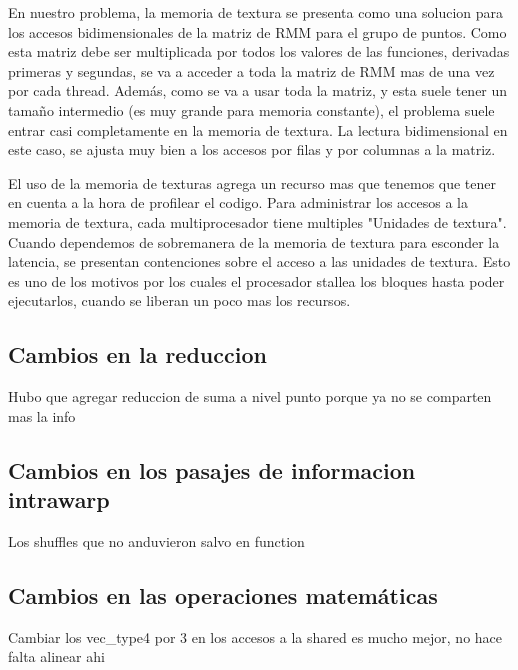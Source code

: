 En nuestro problema, la memoria de textura se presenta como una solucion para
los accesos bidimensionales de la matriz de RMM para el grupo de puntos. 
Como esta matriz debe ser multiplicada por todos los valores de las funciones,
derivadas primeras y segundas, se va a acceder a toda la matriz de RMM mas de
una vez por cada thread. Adem\'as, como se va a usar toda la matriz, y esta suele
tener un tamaño intermedio (es muy grande para memoria constante), el problema
suele entrar casi completamente en la memoria de textura.
La lectura bidimensional en este caso, se ajusta muy bien a los accesos por filas
y por columnas a la matriz.

El uso de la memoria de texturas agrega un recurso mas que tenemos que tener en
cuenta a la hora de profilear el codigo. Para administrar los accesos a 
la memoria de textura, cada multiprocesador tiene multiples "Unidades de textura".
Cuando dependemos de sobremanera de la memoria de textura para esconder la latencia,
se presentan contenciones sobre el acceso a las unidades de textura. Esto es
uno de los motivos por los cuales el procesador stallea los bloques hasta poder
ejecutarlos, cuando se liberan un poco mas los recursos.

\subsection{Cambios en la reduccion}
Hubo que agregar reduccion de suma a nivel punto porque ya no se comparten mas la info
\subsection{Cambios en los pasajes de informacion intrawarp}
Los shuffles que no anduvieron salvo en function
\subsection{Cambios en las operaciones matem\'aticas}
Cambiar los vec\_type4 por 3 en los accesos a la shared es mucho mejor, no hace falta alinear ahi
